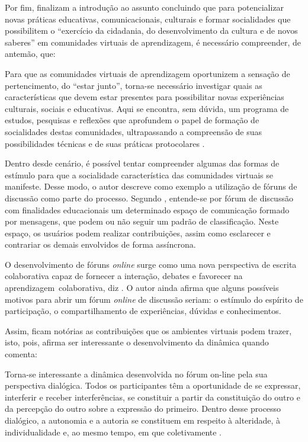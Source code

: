 Por fim,  finalizam a introdução ao assunto concluindo que para potencializar novas práticas educativas, comunicacionais, culturais e formar socialidades que possibilitem o ``exercício da cidadania, do desenvolvimento da cultura e de novos saberes'' em comunidades virtuais de aprendizagem, é necessário compreender, de antemão, que:
\begin{citacao}

Para que as comunidades virtuais de aprendizagem oportunizem a sensação de pertencimento, do “estar junto”, torna-se necessário investigar quais as características que devem estar presentes para possibilitar novas experiências culturais, sociais e educativas. Aqui se encontra, sem dúvida, um programa de estudos, pesquisas e reflexões que aprofundem o papel de formação de socialidades destas comunidades, ultrapassando a compreensão de suas possibilidades técnicas e de suas práticas protocolares \cite{sartori2004comunidades}.

\end{citacao}

Dentro desde cenário, é possível tentar compreender algumas das formas de estímulo para que a socialidade característica das comunidades virtuais se manifeste. Desse modo, o autor  descreve como exemplo a utilização de fóruns de discussão como parte do processo.
Segundo , entende-se por fórum de discussão com finalidades educacionais um determinado espaço de comunicação formado por mensagens, que podem ou não seguir um padrão de classificação. Neste espaço, os usuários podem realizar contribuições, assim como esclarecer e contrariar os demais envolvidos de forma assíncrona.

O desenvolvimento de fóruns \textit{online} surge como uma nova perspectiva de escrita colaborativa capaz de fornecer a interação, debates e favorecer na aprendizagem colaborativa, diz . O autor ainda afirma que alguns possíveis motivos para abrir um fórum \textit{online} de discussão seriam: o estímulo do espírito de participação, o compartilhamento de experiências, dúvidas e conhecimentos.


Assim, ficam notórias as contribuições que os ambientes virtuais podem trazer, isto, pois,  afirma ser interessante o desenvolvimento da dinâmica quando comenta:

\begin{citacao}

Torna-se interessante a dinâmica desenvolvida no fórum on-line pela sua perspectiva dialógica. Todos os participantes têm a oportunidade de se expressar, interferir e receber interferências, se constituir a partir da constituição do outro e da percepção do outro sobre a expressão do primeiro. Dentro desse processo dialógico, a autonomia e a autoria se constituem em respeito à alteridade, à individualidade e, ao mesmo tempo, em que coletivamente \cite{kratochwill2006possibilidades}.

\end{citacao}

